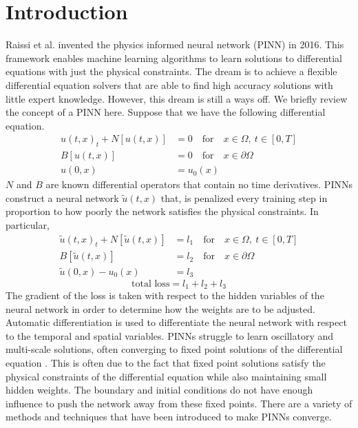 \documentclass[12pt]{article}
\def\~{\tilde}
\begin{document}
\vfill
\newpage
\section{Introduction}

Raissi et al. \cite{pinns} invented the physics informed neural network (PINN) in 2016. This framework enables machine learning algorithms to learn solutions to differential equations with just the physical constraints. The dream is to achieve a flexible differential equation solvers that are able to find high accuracy solutions with little expert knowledge. However, this dream is still a ways off. We briefly review the concept of a PINN here. Suppose that we have the following differential equation.
\begin{align*}
	u(t,x)_t + N[u(t,x)] &= 0 \quad \text{for} \quad x \in \Omega, \: t \in [0,T]\\
	B[u(t,x)] &= 0 \quad \text{for} \quad x \in \partial \Omega\\
	u(0,x) &= u_0(x)
\end{align*}
$N$ and $B$ are known differential operators that contain no time derivatives. PINNs construct a neural network $\~u(t,x)$ that, is penalized every training step in proportion to how poorly the network satisfies the physical constraints. In particular,
\begin{align*}
	\~u(t,x)_t + N[\~u(t,x)] &= l_1 \quad \text{for} \quad x \in \Omega, \: t \in [0,T]\\
	B[\~u(t,x)] &= l_2 \quad \text{for} \quad x \in \partial \Omega\\
	\~u(0,x) - u_0(x)& = l_3
\end{align*}
\begin{equation*}
\text{total loss} = l_1 + l_2 + l_3
\end{equation*}
The gradient of the loss is taken with respect to the hidden variables of the neural network in order to determine how the weights are to be adjusted. Automatic differentiation is used to differentiate the neural network with respect to the temporal and spatial variables. PINNs struggle to learn oscillatory and multi-scale solutions, often converging to fixed point solutions of the differential equation \cite{fixedpts}. This is often due to the fact that fixed point solutions satisfy the physical constraints of the differential equation while also maintaining small hidden weights. The boundary and initial conditions do not have enough influence to push the network away from these fixed points. There are a variety of methods and techniques that have been introduced to make PINNs converge.
\end{document}

